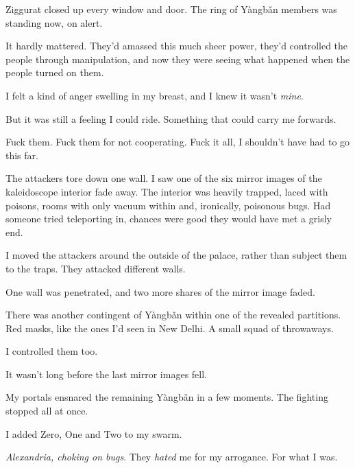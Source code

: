 Ziggurat closed up every window and door.  The ring of Y\`{a}ngb\v{a}n members was standing now, on alert.



It hardly mattered.  They'd amassed this much sheer power, they'd controlled the people through manipulation, and now they were seeing what happened when the people turned on them.



I felt a kind of anger swelling in my breast, and I knew it wasn't \emph{mine}.



But it was still a feeling I could ride.  Something that could carry me forwards.



Fuck them.  Fuck them for not cooperating.  Fuck it all, I shouldn't have had to go this far.



The attackers tore down one wall.  I saw one of the six mirror images of the kaleidoscope interior fade away.  The interior was heavily trapped, laced with poisons, rooms with only vacuum within and, ironically, poisonous bugs.  Had someone tried teleporting in, chances were good they would have met a grisly end.



I moved the attackers around the outside of the palace, rather than subject them to the traps.  They attacked different walls.



One wall was penetrated, and two more shares of the mirror image faded.



There was another contingent of Y\`{a}ngb\v{a}n within one of the revealed partitions.  Red masks, like the ones I'd seen in New Delhi.  A small squad of throwaways.



I controlled them too.



It wasn't long before the last mirror images fell.



My portals ensnared the remaining Y\`{a}ngb\v{a}n in a few moments.  The fighting stopped all at once.



I added Zero, One and Two to my swarm.



\emph{Alexandria, choking on bugs}.  They \emph{hated} me for my arrogance.  For what I was.




